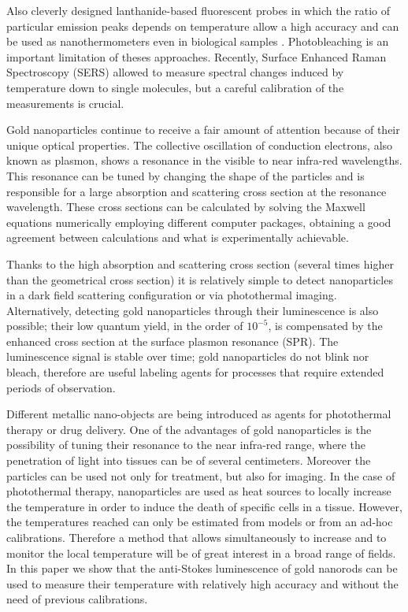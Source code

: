 \documentclass[journal=nalefd,manuscript=letter]{achemso}
\begin{document}
Also cleverly designed lanthanide-based fluorescent probes in which the ratio of
particular emission peaks depends on temperature allow a high accuracy and can
be used as nanothermometers \cite{liu2016ratiometric} even in biological samples
\cite{Vetrone2010}. Photobleaching is an important limitation of theses
approaches. Recently, Surface Enhanced Raman Spectroscopy (SERS) allowed to
measure spectral changes induced by temperature down to single
molecules\cite{Pozzi2015}, but a careful calibration of the measurements is
crucial.

Gold nanoparticles continue to receive a fair amount of attention because of
their unique optical properties\cite{Zijlstra2011}. The collective oscillation
of conduction electrons, also known as plasmon, shows a resonance in the visible to
near infra-red wavelengths. This resonance can be tuned by changing the shape of
the particles\cite{Carattino2016} and is responsible for a large absorption
and scattering cross section at the resonance wavelength. These cross sections can
be calculated by solving the Maxwell equations numerically employing different computer
packages\cite{Draine1994,Yurkin2011,Oskooi2010}, obtaining a good agreement
between calculations and what is experimentally achievable. 

Thanks to the high absorption and scattering cross section (several times higher
than the geometrical cross section) it is relatively simple to detect
nanoparticles in a dark field scattering configuration\cite{Hu2008} or via
photothermal imaging\cite{boyer2002photothermal, Berciaud2006}.
Alternatively, detecting gold nanoparticles through their
luminescence\cite{Tcherniak2011} is also possible; their low quantum
yield\cite{Fang2012,Rao2015,Yorulmaz2012,Cheng2015}, in the order of $10^{-5}$,
is compensated by the enhanced cross section at the surface plasmon resonance
(SPR). The luminescence signal is stable over time; gold nanoparticles do not
blink nor bleach, therefore are useful labeling agents for processes that
require extended periods of observation\cite{Wang2005}.

Different metallic nano-objects are being introduced as agents for photothermal
therapy\cite{Huang2006,Huang2008} or drug delivery\cite{Kang2013}. One of the
advantages of gold nanoparticles is the possibility of tuning their resonance to
the near infra-red range, where the penetration of light into tissues can be of
several
centimeters\cite{Huang2006,Gobin2007,Hirsch2003,ONeal2004,Li2013c,Huang2008}.
Moreover the particles can be used not only for treatment, but also for
imaging\cite{Zhao2014a,Huang2006}. In the case of photothermal therapy,
nanoparticles are used as heat sources\cite{Gobin2007,Hirsch2003} to locally
increase the temperature in order to induce the death of specific cells in a
tissue\cite{Huang2008,Huang2006}. However, the temperatures
reached\cite{Donner2013} can only be estimated from models\cite{Zhao2014a} or
from an ad-hoc calibrations. Therefore a method that allows simultaneously to
increase and to monitor the local temperature will be of great interest in a
broad range of fields. In this paper we show that the anti-Stokes luminescence
of gold nanorods can be used to measure their temperature with relatively high
accuracy and without the need of previous calibrations.
\end{document}
